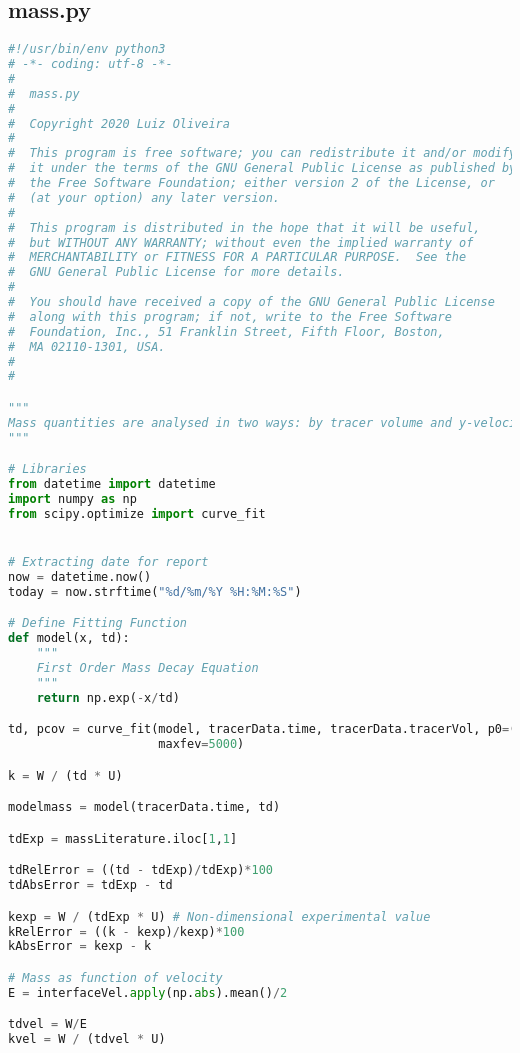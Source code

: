 \subsection{mass.py}
\begin{lstlisting}[language=python]
#!/usr/bin/env python3
# -*- coding: utf-8 -*-
#
#  mass.py
#  
#  Copyright 2020 Luiz Oliveira
#  
#  This program is free software; you can redistribute it and/or modify
#  it under the terms of the GNU General Public License as published by
#  the Free Software Foundation; either version 2 of the License, or
#  (at your option) any later version.
#  
#  This program is distributed in the hope that it will be useful,
#  but WITHOUT ANY WARRANTY; without even the implied warranty of
#  MERCHANTABILITY or FITNESS FOR A PARTICULAR PURPOSE.  See the
#  GNU General Public License for more details.
#  
#  You should have received a copy of the GNU General Public License
#  along with this program; if not, write to the Free Software
#  Foundation, Inc., 51 Franklin Street, Fifth Floor, Boston,
#  MA 02110-1301, USA.
#  
#  

"""
Mass quantities are analysed in two ways: by tracer volume and y-velocity
"""

# Libraries
from datetime import datetime
import numpy as np
from scipy.optimize import curve_fit


# Extracting date for report
now = datetime.now()
today = now.strftime("%d/%m/%Y %H:%M:%S")

# Define Fitting Function
def model(x, td):
    """
    First Order Mass Decay Equation
    """
    return np.exp(-x/td)

td, pcov = curve_fit(model, tracerData.time, tracerData.tracerVol, p0=(40),
                     maxfev=5000)

k = W / (td * U)

modelmass = model(tracerData.time, td)

tdExp = massLiterature.iloc[1,1]

tdRelError = ((td - tdExp)/tdExp)*100
tdAbsError = tdExp - td

kexp = W / (tdExp * U) # Non-dimensional experimental value
kRelError = ((k - kexp)/kexp)*100
kAbsError = kexp - k

# Mass as function of velocity
E = interfaceVel.apply(np.abs).mean()/2

tdvel = W/E
kvel = W / (tdvel * U)


\end{lstlisting}
